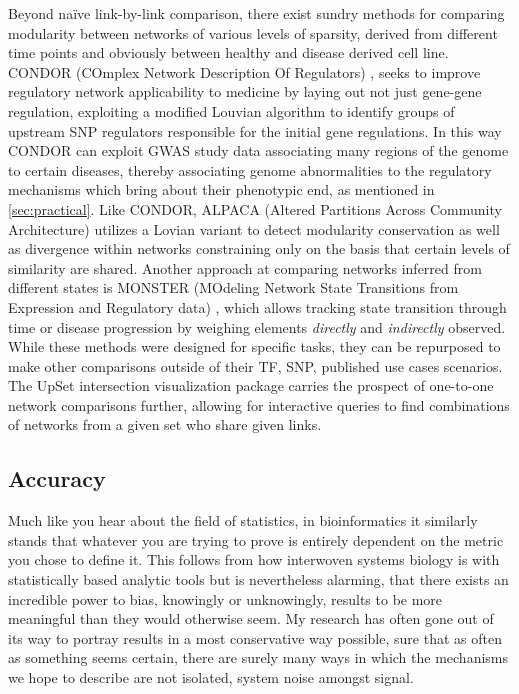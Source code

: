 Beyond na{\"i}ve link-by-link comparison, there exist sundry methods for comparing modularity between networks of various levels of sparsity, \eg derived from different time points and obviously between healthy and disease derived cell line. CONDOR (COmplex Network Description Of Regulators) \citep{platig2016bipartite}, seeks to improve regulatory network applicability to medicine by laying out not just gene-gene regulation, exploiting a modified Louvian algorithm to identify groups of upstream SNP regulators responsible for the initial gene regulations. In this way CONDOR can exploit GWAS study data associating many regions of the genome to certain diseases, thereby associating genome abnormalities to the regulatory mechanisms which bring about their phenotypic end, as mentioned in \cref{sec:practical}.
Like CONDOR, ALPACA (Altered Partitions Across Community Architecture) \citep{padi2018detecting} utilizes a Lovian variant to detect modularity conservation as well as divergence within networks constraining only on the basis that certain levels of similarity are shared. Another approach at comparing networks inferred from different states is MONSTER (MOdeling Network State Transitions from Expression and Regulatory data) \citep{schlauch2017estimating}, which allows tracking state transition through time or disease progression by weighing elements \emph{directly} and \emph{indirectly} observed. While these methods were designed for specific tasks, they can be repurposed to make other comparisons outside of their TF, SNP, \etc published use cases scenarios. The UpSet \citep{lex2014upset} intersection visualization package carries the prospect of one-to-one network comparisons further, allowing for interactive queries to find combinations of networks from a given set who share given links.

\subsection{Accuracy}
\label{sec:acc}

Much like you hear about the field of statistics, in bioinformatics it similarly stands that whatever you are trying to prove is entirely dependent on the metric you chose to define it. This follows from how interwoven systems biology is with statistically based analytic tools but is nevertheless alarming, that there exists an incredible power to bias, knowingly or unknowingly, results to be more meaningful than they would otherwise seem. My research has often gone out of its way to portray results in a most conservative way possible, sure that as often as something seems certain, there are surely many ways in which the mechanisms we hope to describe are not isolated, \ie system noise amongst signal.

